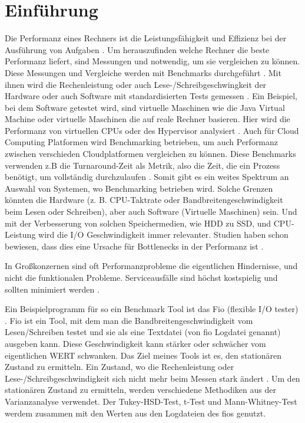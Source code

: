 \documentclass{article}
\begin{document}
\newpage
\section{Einführung}
Die Performanz eines Rechners ist die Leistungsfähigkeit und Effizienz bei der Ausführung von Aufgaben \cite{Delst}. Um herauszufinden welche Rechner die beste Performanz liefert, sind Messungen und notwendig, um sie vergleichen zu können. Diese Messungen und Vergleiche werden mit Benchmarks durchgeführt \cite{takevalue}.
Mit ihnen wird die Rechenleistung oder auch Lese-/Schreibgeschwingkeit der Hardware oder auch Software mit standardisierten Tests gemessen \cite{benchmarkingBruno2014}. Ein Beispiel, bei dem Software getestet wird, sind virtuelle Maschinen wie die Java Virtual Machine \cite{10.1145/1297027.1297033} oder virtuelle Maschinen die auf reale Rechner basieren.
Hier wird die Performanz von virtuellen CPUs oder des Hypervisor analysiert \cite{9256518}.
Auch für Cloud Computing Platformen wird Benchmarking betrieben, um auch Performanz zwischen verschieden Cloudplatformen vergleichen zu können. Diese Benchmarks verwenden z.B die Turnaround-Zeit als Metrik, also die Zeit, die ein Prozess benötigt, um vollständig durchzulaufen \cite{10.1145/2493123.2462919}.  Somit gibt es ein weites Spektrum an Auswahl von Systemen, wo  Benchmarking betrieben wird.
Solche Grenzen könnten die Hardware (z. B. CPU-Taktrate oder Bandbreitengeschwindigkeit beim Lesen oder Schreiben), aber auch Software (Virtuelle Maschinen) sein.
Und mit der Verbesserung von solchen Speichermedien, wie HDD zu SSD, und CPU-Leistung wird die I/O Geschwindigkeit immer relevanter. Studien haben schon bewiesen, dass dies eine Ursache für Bottlenecks in der Performanz ist \cite{analysisNVMeSSD}.

In Großkonzernen sind oft Performanzprobleme die eigentlichen Hindernisse, und nicht die funktionalen Probleme. Serviceausfälle sind höchst kostspielig und sollten minimiert werden \cite{whenStopPerformanceTest}. 

Ein Beispielprogramm für so ein Benchmark Tool ist das Fio (flexible I/O tester) \cite{axboe2021github}.
Fio ist ein Tool, mit dem man die Bandbreitengeschwindigkeit vom Lesen/Schreiben testet und sie als eine Textdatei (von fio Logdatei genannt) ausgeben kann. Diese Geschwindigkeit kann stärker oder schwächer vom eigentlichen WERT schwanken. Das Ziel meines Tools ist es, den stationären Zustand zu ermitteln.
Ein Zustand, wo die Rechenleistung oder Lese-/Schreibgeschwindigkeit sich nicht mehr beim Messen stark ändert \cite{vmsHotandCold}. 
Um den stationären Zustand zu ermitteln, werden verschiedene Methodiken aus der Varianzanalyse verwendet. Der Tukey-HSD-Test, t-Test und Mann-Whitney-Test werdem zusammen mit den Werten aus den Logdateien des fios genutzt. 
\end{document}
